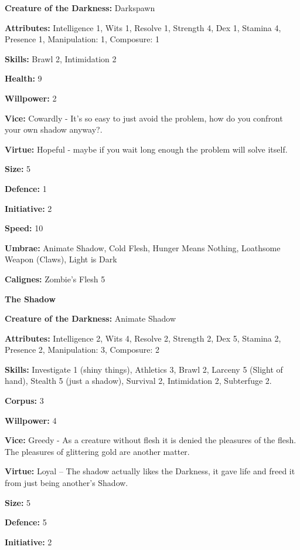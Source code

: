 \noindent \textbf{Creature of the Darkness:} Darkspawn

\noindent \textbf{Attributes:} Intelligence 1, Wits 1, Resolve 1, Strength 4, Dex 1, Stamina 4, Presence 1, Manipulation: 1, Composure: 1

\noindent \textbf{Skills:} Brawl 2, Intimidation 2

\noindent \textbf{Health:} 9

\noindent \textbf{Willpower:} 2

\noindent \textbf{Vice:} Cowardly - It's so easy to just avoid the problem, how do you confront your own shadow anyway?.

\noindent \textbf{Virtue:} Hopeful - maybe if you wait long enough the problem will solve itself.

\noindent \textbf{Size:} 5

\noindent \textbf{Defence:} 1

\noindent \textbf{Initiative:} 2

\noindent \textbf{Speed:} 10

\noindent \textbf{Umbrae:} Animate Shadow, Cold Flesh, Hunger Means Nothing, Loathsome Weapon (Claws), Light is Dark

\noindent \textbf{Calignes:} Zombie's Flesh 5

\noindent \textbf{The Shadow}

\noindent \textbf{Creature of the Darkness:} Animate Shadow

\noindent \textbf{Attributes:} Intelligence 2, Wits 4, Resolve 2, Strength 2, Dex 5, Stamina 2, Presence 2, Manipulation: 3, Composure: 2

\noindent \textbf{Skills:} Investigate 1 (shiny things), Athletics 3, Brawl 2, Larceny 5 (Slight of hand), Stealth 5 (just a shadow), Survival 2, Intimidation 2, Subterfuge 2.

\noindent \textbf{Corpus:} 3

\noindent \textbf{Willpower:} 4

\noindent \textbf{Vice:} Greedy - As a creature without flesh it is denied the pleasures of the flesh. The pleasures of glittering gold are another matter.

\noindent \textbf{Virtue:} Loyal – The shadow actually likes the Darkness, it gave life and freed it from just being another's Shadow.

\noindent \textbf{Size:} 5

\noindent \textbf{Defence:} 5

\noindent \textbf{Initiative:} 2

